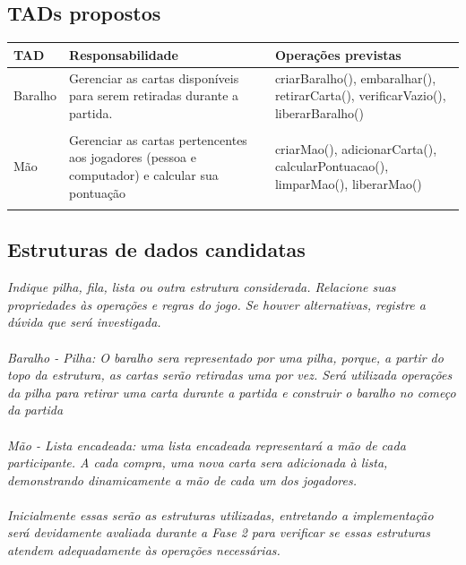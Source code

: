 \documentclass[11pt]{article}
\begin{document}
\subsection{TADs propostos}
\begin{tabularx}{\textwidth}{p{3cm} X X}
  \toprule
  TAD & Responsabilidade & Operações previstas \\
  \midrule
   Baralho & Gerenciar as cartas disponíveis para serem retiradas durante a partida. & criarBaralho(), embaralhar(), retirarCarta(), verificarVazio(),  liberarBaralho() \\
   \\
   Mão & Gerenciar as cartas pertencentes aos jogadores (pessoa e computador) e calcular sua pontuação & criarMao(), adicionarCarta(), calcularPontuacao(), limparMao(), liberarMao() \\
   \\
  \bottomrule
\end{tabularx}

\subsection{Estruturas de dados candidatas}
\textit{Indique pilha, fila, lista ou outra estrutura considerada. Relacione suas propriedades às operações e regras do jogo. Se houver alternativas, registre a dúvida que será investigada.}
\\
\\
\textit{Baralho - Pilha: O baralho sera representado por uma pilha, porque, a partir do topo da estrutura, as cartas serão retiradas uma por vez. Será utilizada operações da pilha para retirar uma carta durante a partida e construir o baralho no começo da partida}
\\
\\
\textit{Mão - Lista encadeada: uma lista encadeada representará a mão de cada participante. A cada compra, uma nova carta sera adicionada à lista, demonstrando dinamicamente a mão de cada um dos jogadores.}
\\
\\
\textit{Inicialmente essas serão as estruturas utilizadas, entretando a implementação será devidamente avaliada durante a Fase 2 para verificar se essas estruturas atendem adequadamente às operações necessárias. }
\AnswerSpace{5mm}
\end{document}
